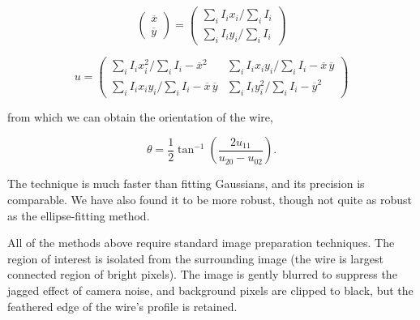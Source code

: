 \begin{equation}
\left( \begin{array}{c}
\overline{x} \\
\overline{y} \end{array} \right)
= \left( \begin{array}{c}
\sum_{i} I_i x_i / \sum_i I_i \\
\sum_{i} I_i y_i / \sum_i I_i \end{array} \right)
\end{equation}

\begin{equation}
u = \left( \begin{array}{cc}
\sum_{i} I_i x_i^2 / \sum_i I_i - \overline{x}^2 & \sum_{i} I_i x_i y_i / \sum_i I_i - \overline{x}\,\overline{y} \\
\sum_{i} I_i x_i y_i / \sum_i I_i - \overline{x}\,\overline{y} & \sum_{i} I_i y_i^2 / \sum_i I_i - \overline{y}^2\end{array} \right)
\end{equation}

\noindent from which we can obtain the orientation of the wire,

\begin{equation}
\theta = \frac{1}{2}\tan^{-1}\left(\frac{2u_{11}}{u_{20} - u_{02}}\right).
\end{equation}

\noindent The technique is much faster than fitting Gaussians, and its precision is comparable. We have also found it to be more robust, though not quite as robust as the ellipse-fitting method.

All of the methods above require standard image preparation techniques. The region of interest is isolated from the surrounding image (the wire is largest connected region of bright pixels). The image is gently blurred to suppress the jagged effect of camera noise, and background pixels are clipped to black, but the feathered edge of the wire's profile is retained.